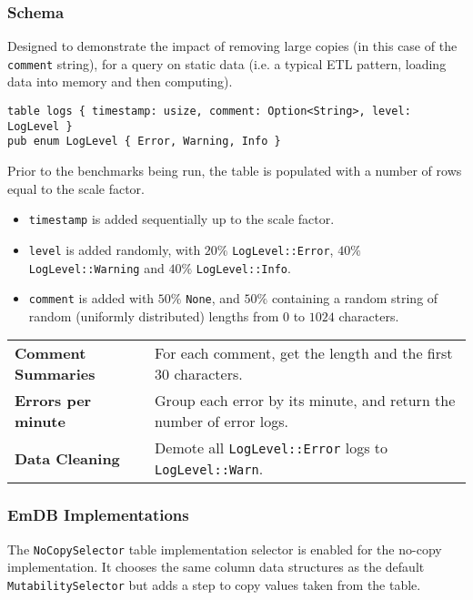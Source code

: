 \subsubsection{Schema}
Designed to demonstrate the impact of removing large copies (in this case of the \texttt{comment} string), for a query on static data (i.e. a typical ETL pattern, loading data into memory and then computing).
\begin{verbatim}
table logs { timestamp: usize, comment: Option<String>, level: LogLevel }
pub enum LogLevel { Error, Warning, Info }
\end{verbatim}
Prior to the benchmarks being run, the table is populated with a number of rows equal to the scale factor.
\begin{itemize}
    \setlength\itemsep{0em}
    \item \texttt{timestamp} is added sequentially up to the scale factor.
    \item \texttt{level} is added randomly, with $20\%$ \texttt{LogLevel::Error}, $40\%$ \texttt{LogLevel::Warning} and $40\%$ \texttt{LogLevel::Info}.
    \item \texttt{comment} is added with $50\%$ \texttt{None}, and $50\%$ containing a random string of random (uniformly distributed) lengths from $0$ to $1024$ characters.
\end{itemize}
\noindent
\begin{tabular}{l p{}}
    \textbf{Comment Summaries} & For each comment, get the length and the first 30 characters.                            \\
    \textbf{Errors per minute} & Group each error by its minute, and return the number of error logs.                     \\
    \textbf{Data Cleaning}     & Demote all \texttt{LogLevel::Error} logs to \texttt{LogLevel::Warn}. \\
\end{tabular}

\subsubsection{EmDB Implementations}
The \texttt{NoCopySelector} table implementation selector is enabled for the no-copy \emdb
implementation. It chooses the same column data structures as the default \texttt{MutabilitySelector}
but adds a step to copy values taken from the table.
